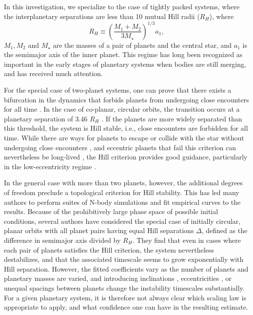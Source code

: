 In this investigation, we specialize to the case of tightly packed systems, where the interplanetary separations are less than 10 mutual Hill radii ($R_H$), where
\begin{equation}
R_H \equiv \left(\frac{M_1+M_2}{3M_\star} \right)^{1/3} a_1,
\end{equation}
$M_1, M_2$ and $M_\star$ are the masses of a pair of planets and the central star, and $a_1$ is the semimajor axis of the inner planet.
This regime has long been recognized as important in the early stages of planetary systems when bodies are still merging, and has received much attention.

For the special case of two-planet systems, one can prove that there exists a bifurcation in the dynamics that forbids planets from undergoing close encounters for all time \citep{Marchal82, Milani83}.
In the case of co-planar, circular orbits, the transition occurs at a planetary separation of 3.46 $R_H$ \citep{Gladman1993}.
If the planets are more widely separated than this threshold, the system is Hill stable, i.e., close encounters are forbidden for all time.
While there are ways for planets to escape or collide with the star without undergoing close encounters \citep[e.g.,][]{Deck12, Veras13hill}, and eccentric planets that fail this criterion can nevertheless be long-lived \citep[e.g.,][]{Gladman1993}, the Hill criterion provides good guidance, particularly in the low-eccentricity regime \citep{Barnes06}.

In the general case with more than two planets, however, the additional degrees of freedom preclude a topological criterion for Hill stability.
This has led many authors to perform suites of N-body simulations and fit empirical curves to the results.
Because of the prohibitively large phase space of possible initial conditions, several authors \citep[][Obertas et al., submitted]{Chambers1996, Faber07, Smith09} have considered the special case of initially circular, planar orbits with all planet pairs having equal Hill separations $\Delta$, defined as the difference in semimajor axis divided by $R_H$.
They find that even in cases where each pair of planets satisfies the Hill criterion, the system nevertheless destabilizes, and that the associated timescale seems to grow exponentially with Hill separation.
However, the fitted coefficients vary as the number of planets and planetary masses are varied, and introducing inclinations \citep{Marzari02}, eccentricities \citep{Ito99, Chatterjee08, Pu2015}, or unequal spacings between planets \citep{Marzari14} change the instability timescales substantially.
For a given planetary system, it is therefore not always clear which scaling law is appropriate to apply, and what confidence one can have in the resulting estimate.

